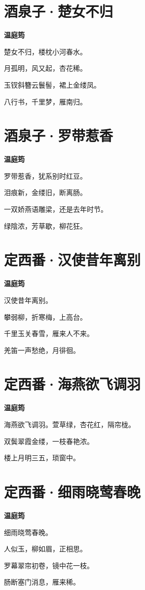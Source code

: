 \documentclass[12pt,a4paper]{ctexbook}
\begin{document}
\section{酒泉子·楚女不归}
\textbf{温庭筠}\par\vspace{0.5em}
楚女不归，楼枕小河春水。\par
月孤明，风又起，杏花稀。\par
玉钗斜簪云鬟髻，裙上金缕凤。\par
八行书，千里梦，雁南归。\par

\section{酒泉子·罗带惹香}
\textbf{温庭筠}\par\vspace{0.5em}
罗带惹香，犹系别时红豆。\par
泪痕新，金缕旧，断离肠。\par
一双娇燕语雕梁，还是去年时节。\par
绿陰浓，芳草歇，柳花狂。\par

\section{定西番·汉使昔年离别}
\textbf{温庭筠}\par\vspace{0.5em}
汉使昔年离别。\par
攀弱柳，折寒梅，上高台。\par
千里玉关春雪，雁来人不来。\par
羌笛一声愁绝，月徘徊。\par

\section{定西番·海燕欲飞调羽}
\textbf{温庭筠}\par\vspace{0.5em}
海燕欲飞调羽。萱草绿，杏花红，隔帘栊。\par
双鬓翠霞金缕，一枝春艳浓。\par
楼上月明三五，琐窗中。\par

\section{定西番·细雨晓莺春晚}
\textbf{温庭筠}\par\vspace{0.5em}
细雨晓莺春晚。\par
人似玉，柳如眉，正相思。\par
罗幕翠帘初卷，镜中花一枝。\par
肠断塞门消息，雁来稀。\par
\end{document}
